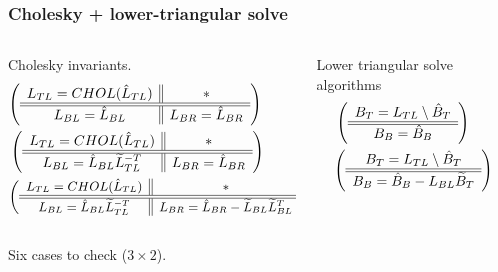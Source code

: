\documentclass{beamer}
\begin{document}
\begin{frame}
  \frametitle{Cholesky + lower-triangular solve}
  \begin{columns}
    \begin{column}[t]{0.45\textwidth}
      Cholesky invariants.
      \begin{align*}
        &{\left( \begin{array}{c || c} L_{TL} = CHOL(\hat{L}_{TL}) & * \\ \hline \hline L_{BL} = \hat{L}_{BL} & L_{BR} = \hat{L}_{BR} \end{array} \right)}\\
        &\left( \begin{array}{c || c} L_{TL} = CHOL(\hat{L}_{TL}) & * \\ \hline \hline L_{BL} = \hat{L}_{BL}\widetilde{L}_{TL}^{-T} & L_{BR} = \hat{L}_{BR} \end{array} \right)\\
        &{\small \left( \begin{array}{c || c} L_{TL} = CHOL(\hat{L}_{TL}) & * \\ \hline \hline L_{BL} = \hat{L}_{BL}\widetilde{L}_{TL}^{-T} & L_{BR} = \hat{L}_{BR} - \widetilde{L}_{BL}\widetilde{L}_{BL}^T \end{array} \right)}
      \end{align*}
    \end{column}
    \begin{column}[t]{0.55\textwidth}
      Lower triangular solve algorithms
      \begin{align*}
        &\left( \begin{array}{c} B_T = L_{TL} \setminus \hat{B}_T \\ \hline \hline B_B = \hat{B}_B \end{array} \right)\\
        &{\left( \begin{array}{c} B_T = L_{TL} \setminus \hat{B}_T \\ \hline \hline B_B = \hat{B}_B - L_{BL}\widetilde{B}_T \end{array} \right)}
      \end{align*}
    \end{column}
  \end{columns}

  Six cases to check ($3 \times 2$).
\end{frame}
\end{document}
